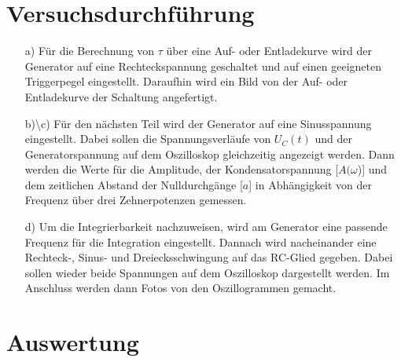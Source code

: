 \section{Versuchsdurchführung}
\begin{enumerate}
\item[a)] Für die Berechnung von $\tau$ über eine Auf- oder Entladekurve wird der 
          Generator auf eine Rechteckspannung geschaltet und auf einen geeigneten 
          Triggerpegel eingestellt. Daraufhin wird ein Bild von der Auf- 
          oder Entladekurve der Schaltung angefertigt.\\
\item[b)\textbackslash c)] Für den nächsten Teil wird der Generator auf eine Sinusspannung 
          eingestellt. Dabei sollen die Spannungsverläufe von $U_C(t)$ und der 
          Generatorspannung auf dem Oszilloskop gleichzeitig angezeigt werden. 
          Dann werden die Werte für die Amplitude, der Kondensatorspannung 
          [$A(\omega$)] und dem zeitlichen Abstand der Nulldurchgänge 
          [$a$] in Abhängigkeit von der Frequenz über drei Zehnerpotenzen gemessen.\\
\item[d)] Um die Integrierbarkeit nachzuweisen, wird am Generator eine passende 
          Frequenz für die Integration eingestellt. Dannach wird nacheinander eine 
          Rechteck-, Sinus- und Dreiecksschwingung auf das RC-Glied gegeben. 
          Dabei sollen wieder beide Spannungen auf dem Oszilloskop dargestellt 
          werden. Im Anschluss werden dann Fotos von den Oszillogrammen gemacht.
\end{enumerate}

\section{Auswertung}

  
